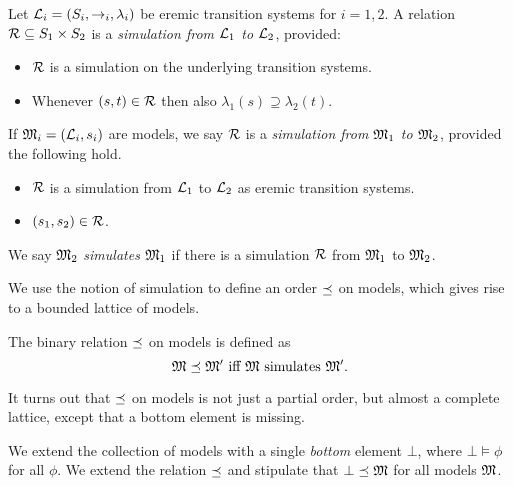 \begin{definition}
Let $\mathcal{L}_i = (S_i, \rightarrow_i, \lambda_i)$ be eremic transition
systems for $i = 1, 2$.  A relation $\mathcal{R} \subseteq S_1 \times S_2$ is
a \emph{simulation from $\mathcal{L}_1$ to $\mathcal{L}_2$}, provided:
\begin{itemize} 

\item $\mathcal{R}$ is a simulation on the underlying transition systems. 

\item Whenever $(s, t) \in \mathcal{R}$ then also $\lambda_1(s) \supseteq
  \lambda_2(t)$.

\end{itemize}

\NI If $\frak{M}_i = (\mathcal{L}_i, s_i)$ are models, we say $\mathcal{R}$ is a
\emph{simulation from $\frak{M}_1$ to $\frak{M}_2$}, provided the following hold.

\begin{itemize}

\item $\mathcal{R}$ is a simulation from $\mathcal{L}_1$ to $\mathcal{L}_2$ as eremic transition systems.

\item  $(s_1, s_2) \in \mathcal{R}$. 

\end{itemize}

\NI We say $\frak{M}_2$ \emph{simulates} $\frak{M}_1$ if there is a simulation $\mathcal{R}$ 
from $\frak{M}_1$ to $\frak{M}_2$.



\end{definition}

We use the notion of
simulation to define an order $\preceq$ on models, which gives rise
to a bounded lattice of models.

\begin{definition}
The binary relation $\preceq$ on models is defined as
\[
   \frak{M} \preceq \frak{M}' \text{ iff } \frak{M} \text{ simulates } \frak{M}' .
\]
\end{definition}
It turns out that $\preceq $ on models is not just a partial order, but
almost a complete lattice, except that a bottom element is missing.
\begin{definition}
We extend the collection of models with a single \emph{bottom} element
$\bot$, where $\bot \models \phi$ for all $\phi$. 
We extend the relation $\preceq $  and stipulate that $\bot
\preceq \frak{M}$ for all models $\frak{M}$.
\end{definition}

